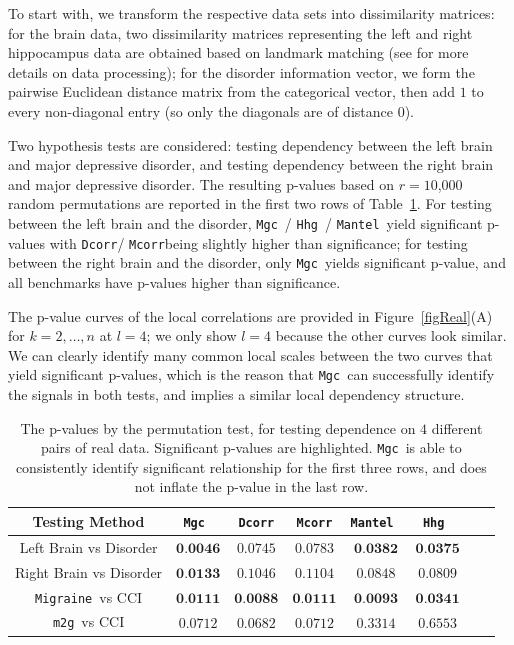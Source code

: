\documentclass[11pt]{article}
\newcommand{\note}[2][]{\added[#1,remark={#2}]{}}
\providecommand{\sct}[1]{{\sc \texttt{#1}}}
\newcommand{\Migraine}{\sct{Migraine}}
\newcommand{\mtg}{\sct{m2g}}
\newcommand{\Mgc}{\sct{Mgc}}
\newcommand{\Hhg}{\sct{Hhg}}
\newcommand{\Dcorr}{\sct{Dcorr}}
\newcommand{\Mcorr}{\sct{Mcorr}}
\newcommand{\Mantel}{\sct{Mantel}}
\newcommand{\jovo}[1]{{\note{jv: #1}}}
\newcommand{\cs}[1]{{\note{cs: #1}}}
\begin{document}
To start with, we transform the respective data sets into dissimilarity matrices: for the brain data, two dissimilarity matrices representing the left and right hippocampus data are obtained based on landmark matching (see \cite{ParkEtAl2011} for more details on data processing); for the disorder information vector,
we form the pairwise Euclidean distance matrix from the categorical vector, then add $1$ to every non-diagonal entry (so only the diagonals are of distance $0$).

Two hypothesis tests are considered: testing dependency between the left brain and major depressive disorder, and testing dependency between the right brain and major depressive disorder. The resulting p-values based on $r=10$,$000$ random permutations are reported in the first two rows of Table~\ref{table1}. For testing between the left brain and the disorder, \Mgc~/ \Hhg~/ \Mantel~yield significant p-values with \Dcorr / \Mcorr being slightly higher than significance; for testing between the right brain and the disorder, only \Mgc~yields significant p-value, and all benchmarks have p-values higher than significance. 

The p-value curves of the local correlations are provided in Figure~\ref{figReal}(A) for $k=2,\ldots,n$ at $l=4$; we only show $l=4$ because the other curves look similar. We can clearly identify many common local scales between the two curves that yield significant p-values, which is the reason that \Mgc~can successfully identify the signals in both tests, and implies a similar local dependency structure. 

\begin{table}[!t]
\Large
\renewcommand{\arraystretch}{0.5}
\centering
{\begin{tabular}{|c||c|c|c|c|c|c|c|}
\hline
Testing Method & \Mgc~& \Dcorr & \Mcorr & \Mantel~& \Hhg~\\
\hline
Left Brain vs Disorder  & $\textbf{0.0046}$ & $0.0745$ & $0.0783$ & $\textbf{0.0382}$ & $\textbf{0.0375}$ \\
\hline
Right Brain vs Disorder & $\textbf{0.0133}$ & $0.1046$ & $0.1104$  & $0.0848$ & $0.0809$\\
\hline
\Migraine~vs CCI & $\textbf{0.0111}$ & $\textbf{0.0088}$ & $\textbf{0.0111}$  & $\textbf{0.0093}$ & $\textbf{0.0341}$\\
\hline
\mtg~vs CCI & $0.0712$ & $0.0682$ & $0.0712$  & $0.3314$ & $0.6553$\\
\hline
\end{tabular}
\caption{The p-values by the permutation test, for testing dependence on $4$ different pairs of real data. Significant p-values are highlighted. \Mgc~is able to consistently identify significant relationship for the first three rows, and does not inflate the p-value in the last row.}
\label{table1}
}
\end{table}
\jovo{maybe bold everything in table that is significant?}
\cs{done}
\end{document}

